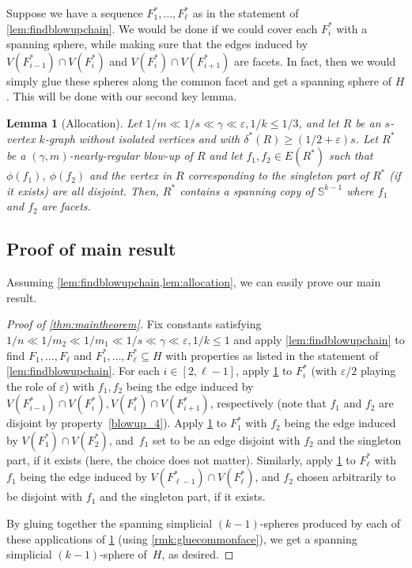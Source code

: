 \documentclass[12pt,reqno]{amsart}
\theoremstyle{plain}
\newtheorem{lemma}[theorem]{Lemma}
\theoremstyle{definition}
\numberwithin{equation}{section}
\renewcommand{\ge}{\geqslant}
\renewcommand{\leq}{\leqslant}
\newcommand{\eps}{\varepsilon}
\newcommand{\comin}{\delta^{\ast}}
\newcommand{\bS}{\mathbb{S}}
\begin{document}
	Suppose we have a sequence $F_1^\ast, \dotsc, F_\ell^\ast$ as in the statement of \cref{lem:findblowupchain}.
	We would be done if we could cover each $F_i^\ast$ with a spanning sphere, while making sure that the edges induced by $V(F_{i-1}^\ast)\cap V(F_{i}^\ast)$ and $V(F_{i}^\ast)\cap V(F_{i+1}^\ast)$ are facets.
	In fact, then we would simply glue these spheres along the common facet and get a spanning sphere of $H$.
	This will be done with our second key lemma.
	
	\begin{lemma}[Allocation]\label{lem:allocation}
		Let $1/m\ll 1/s\ll \gamma \ll \eps, 1/k\leq 1/3$, and let $R$ be an $s$-vertex $k$-graph without isolated vertices and with $\comin(R) \ge (1/2 + \eps)s$. Let $R^\ast$ be a $(\gamma, m)$-nearly-regular blow-up of $R$ and let $f_1, f_2 \in E(R^\ast)$ such that $\phi(f_1)$, $\phi(f_2)$ and the vertex in $R$ corresponding to the singleton part of $R^\ast$ \textup{(}if it exists\textup{)} are all disjoint. Then, $R^\ast$ contains a spanning copy of $\bS^{k - 1}$ where $f_1$ and $f_2$ are facets.
	\end{lemma}
	
	
	\subsection{Proof of main result}
	
	Assuming \cref{lem:findblowupchain,lem:allocation}, we can easily prove our main result.
	
	\begin{proof}[Proof of \cref{thm:maintheorem}]
		Fix constants satisfying $1/n\ll 1/m_2\ll 1/m_1 \ll 1/s \ll \gamma \ll \eps, 1/k\leq 1$ and apply \cref{lem:findblowupchain} to find $F_1,\dotsc, F_\ell$ and $F_1^\ast,\dotsc, F_\ell^\ast\subseteq H$ with properties as listed in the statement of \cref{lem:findblowupchain}. For each $i\in [2,\ell-1]$, apply \cref{lem:allocation} to $F_i^\ast$ (with $\eps/2$ playing the role of $\eps$) with $f_1, f_2$ being the edge induced by $V(F_{i-1}^\ast)\cap V(F_{i}^\ast), V(F_{i}^\ast)\cap V(F_{i+1}^\ast)$, respectively (note that $f_1$ and $f_2$ are disjoint by property~\ref{blowup_4}). Apply \cref{lem:allocation} to $F_1^\ast$ with $f_2$ being the edge induced by $V(F_{1}^\ast)\cap V(F_{2}^\ast)$, and~$f_1$ set to be an edge disjoint with $f_2$ and the singleton part, if it exists (here, the choice does not matter). Similarly, apply \cref{lem:allocation} to $F_\ell^\ast$ with $f_1$ being the edge induced by $V(F_{\ell-1}^\ast)\cap V(F_{\ell}^\ast)$, and $f_2$ chosen arbitrarily to be disjoint with $f_1$ and the singleton part, if it exists.
		
		By gluing together the spanning simplicial $(k - 1)$-spheres produced by each of these applications of \cref{lem:allocation} (using \cref{rmk:gluecommonface}), we get a spanning simplicial $(k - 1)$-sphere of~$H$, as desired.
	\end{proof}
	
\end{document}
